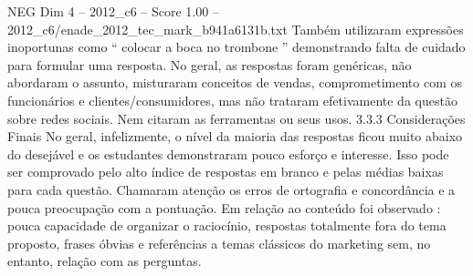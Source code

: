 \begin{textsample}{NEG Dim 4 – 2012\_c6 – Score 1.00 – 2012\_c6/enade\_2012\_tec\_mark\_b941a6131b.txt}
Também utilizaram expressões inoportunas como “ colocar a boca no trombone ” demonstrando falta de cuidado para formular uma resposta.
No geral, as respostas foram genéricas, não abordaram o assunto, misturaram conceitos de vendas, comprometimento com os funcionários e clientes/consumidores, mas não trataram efetivamente da questão sobre redes sociais.
Nem citaram as ferramentas ou seus usos. 3.3.3 Considerações Finais No geral, infelizmente, o nível da maioria das respostas ficou muito abaixo do desejável e os estudantes demonstraram pouco esforço e interesse.
Isso pode ser comprovado pelo alto índice de respostas em branco e pelas médias baixas para cada questão.
Chamaram atenção os erros de ortografia e concordância e a pouca preocupação com a pontuação.
Em relação ao conteúdo foi observado : pouca capacidade de organizar o raciocínio, respostas totalmente fora do tema proposto, frases óbvias e referências a temas clássicos do marketing sem, no entanto, relação com as perguntas.

\end{textsample}
